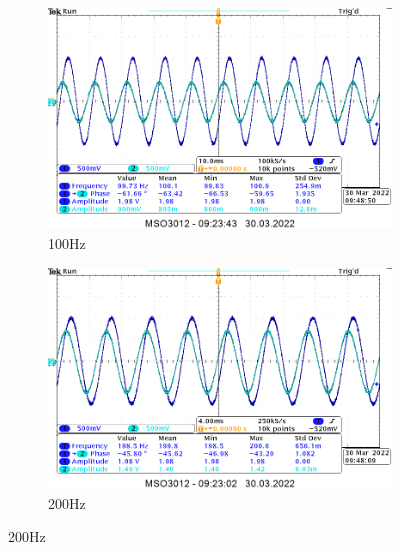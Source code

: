 \begin{itemize}
{    \begin{figure}[H]
        \centering    
        \begin{subfigure}[h]{0.4\textwidth}
            \includegraphics[width=\textwidth]{img_osciloscope/CR/CR_100Hz_cropped.png}
            \caption*{100Hz}
        \end{subfigure}
        \begin{subfigure}[h]{0.4\textwidth}
            \includegraphics[width=\textwidth]{img_osciloscope/CR/CR_200Hz_cropped.png}
            \caption*{200Hz}
        \end{subfigure}
    \end{figure}
    
}
\end{itemize}
